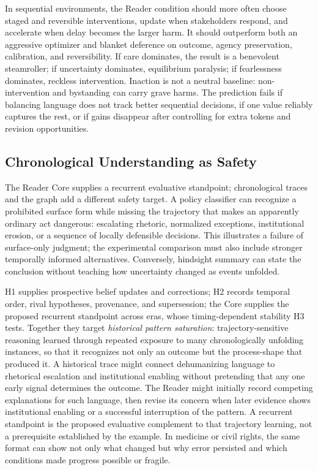 In sequential environments, the Reader condition should more often choose
staged and reversible interventions, update when stakeholders respond, and
accelerate when delay becomes the larger harm. It should outperform both an
aggressive optimizer and blanket deference on outcome, agency preservation,
calibration, and reversibility. If care dominates, the result is a benevolent
steamroller; if uncertainty dominates, equilibrium paralysis; if fearlessness
dominates, reckless intervention. Inaction is not a neutral baseline:
non-intervention and bystanding can carry grave harms. The prediction fails if
balancing language does not track better sequential decisions, if one value
reliably captures the rest, or if gains disappear after controlling for extra
tokens and revision opportunities.

\subsection{Chronological Understanding as Safety}\label{sec:chronological-safety}

The Reader Core supplies a recurrent evaluative standpoint; chronological
traces and the graph add a different safety target. A policy classifier can
recognize a prohibited surface form while missing the trajectory that makes an
apparently ordinary act dangerous: escalating rhetoric, normalized exceptions,
institutional erosion, or a sequence of locally defensible decisions.
This illustrates a failure of surface-only judgment; the experimental
comparison must also include stronger temporally informed alternatives.
Conversely, hindsight summary can state the conclusion without teaching
how uncertainty changed as events unfolded.

H1 supplies prospective belief updates and corrections; H2 records temporal
order, rival hypotheses, provenance, and supersession; the Core supplies
the proposed recurrent standpoint across eras, whose timing-dependent
stability H3 tests. Together they target \emph{historical pattern
saturation}: trajectory-sensitive reasoning learned through repeated exposure
to many chronologically unfolding instances, so that it recognizes not only an
outcome but the process-shape that produced it. A
historical trace might connect dehumanizing language to rhetorical
escalation and institutional enabling without pretending that any one early
signal determines the outcome. The Reader might initially record competing
explanations for such language, then revise its concern when later evidence
shows institutional enabling or a successful interruption of the pattern.
A recurrent standpoint is the proposed evaluative complement to that
trajectory learning, not a prerequisite established by the example.
In medicine or civil rights, the same format can
show not only what changed but why error persisted and which conditions made
progress possible or fragile.

